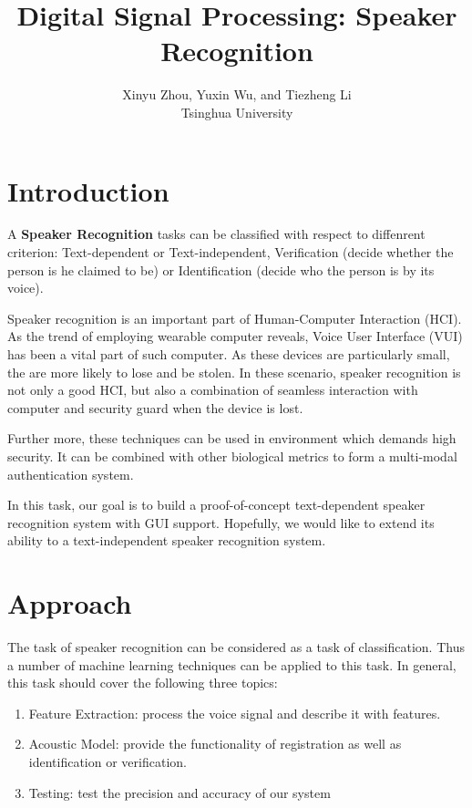 \documentclass{article}
\title{Digital Signal Processing: Speaker Recognition}
\author{Xinyu Zhou, Yuxin Wu, and Tiezheng Li\\ Tsinghua University}
\date{}
\begin{document}
\fontsize{11pt}{1.4em}
\setlength{\baselineskip}{1.6em}
\maketitle
\section{Introduction}
A \textbf{Speaker Recognition} tasks can be classified with respect to diffenrent criterion:
Text-dependent or Text-independent, Verification (decide whether the person is he claimed
to be) or Identification (decide who the person is by its voice).\cite{SRwiki}

Speaker recognition is an important part of Human-Computer Interaction (HCI).
As the trend of employing wearable computer reveals, Voice User Interface (VUI)
has been a vital part of such computer. As these devices are particularly small,
the are more likely to lose and be stolen. In these scenario, speaker recognition
is not only a good HCI, but also a combination of seamless interaction with computer
and security guard when the device is lost.

Further more, these techniques can be used in environment which demands high security.
It can be combined with other biological metrics to form a multi-modal authentication
system.

In this task, our goal is to build a proof-of-concept text-dependent speaker recognition system with GUI support.
Hopefully, we would like to extend its ability to a text-independent speaker recognition system.

\section{Approach}

The task of speaker recognition can be considered as a task of classification. Thus a number of machine learning techniques
can be applied to this task. In general, this task should cover the following three topics:
\begin{enumerate}
  \item Feature Extraction: process the voice signal and describe it with features.

  \item Acoustic Model: provide the functionality of registration as well as identification or verification.

  \item Testing: test the precision and accuracy of our system
\end{enumerate}
\end{document}
